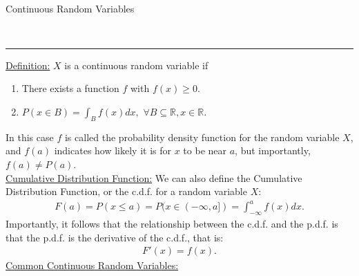 \documentclass{article}
\newcommand{\header}[1]{\begin{large}\noindent #1\end{large}\\\rule{\textwidth}{0.5pt}}
\newcommand{\sheader}[1]{\underline{#1:}}
\newcommand{\gap}{\medskip\\}
\begin{document}
\gap
\header{Continuous Random Variables}
\sheader{Definition} $X$ is a continuous random variable if 
\begin{enumerate}
    \item There exists a function $f$ with $f(x) \geq 0$.
    \item $P(x\in B) = \int_B f(x)dx, \,\, \forall B\subseteq \mathbb{R}, x \in \mathbb{R}$.
\end{enumerate}
In this case $f$ is called the probability density function for the random variable $X$,
and $f(a)$ indicates how likely it is for $x$ to be near $a$, but importantly,
$f(a) \neq P(a)$.
\gap
\sheader{Cumulative Distribution Function} We can also define the Cumulative Distribution Function,
or the c.d.f. for a random variable $X$:
\begin{align*}
    F(a) = P(x \leq a) = P(x \in (-\infty, a]) = \int_{-\infty}^a f(x)dx.
\end{align*}
Importantly, it follows that the relationship between the c.d.f. and the p.d.f. is that
the p.d.f. is the derivative of the c.d.f., that is:
\begin{align*}
    F'(x) = f(x).
\end{align*}
\sheader{Common Continuous Random Variables}
\end{document}
